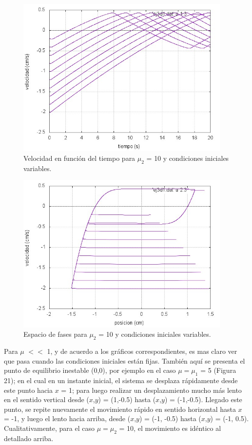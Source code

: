\documentclass[a4paper,12pt]{article}
\begin{document}
\begin{itemize}
\begin{figure}[H]
\begin{center}
\includegraphics[height=8cm]{grafico_ej3d1_vVSt.jpg}
\caption[width=5cm]{Velocidad en funci\'on del tiempo para $\mu_2$ = 10 y condiciones iniciales variables.}
\end{center}
\end{figure}

\begin{figure}[H]
\begin{center}
\includegraphics[height=8cm]{grafico_ej3d1_xVSv.jpg}
\caption[width=5cm]{Espacio de fases para $\mu_2$ = 10 y condiciones iniciales variables.}
\end{center}
\end{figure}


Para $\mu$ $<<$ 1, y de acuerdo a los gr\'aficos correspondientes, es mas claro ver que pasa cuando las condiciones iniciales est\'an fijas.
Tambi\'en aqu\'i se presenta el punto de equilibrio inestable (0,0), por ejemplo en el caso $\mu = \mu_1$ = 5 (Figura 21); en el cual en un instante inicial, el sistema se desplaza r\'apidamente desde este punto hacia $x$ = 1; para luego realizar un desplazamiento mucho m\'as lento en el sentido vertical desde ($x$,$y$) = (1,-0.5) hasta ($x$,$y$) = (-1,-0.5).
Llegado este punto, se repite nuevamente el movimiento r\'apido en sentido horizontal hasta $x$ = -1, y luego el lento hacia arriba, desde ($x$,$y$) = (-1, -0.5) hasta ($x$,$y$) = (-1, 0.5).
Cualitativamente, para el caso $\mu = \mu_2$ = 10, el movimiento es id\'entico al detallado arriba.


\end{itemize}
\end{document}

